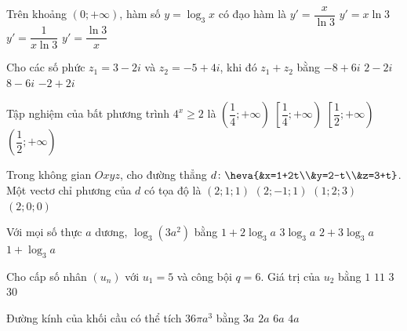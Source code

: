 \begin{ex}%
	Trên khoảng $(0;+\infty)$, hàm số $y=\log_3x$ có đạo hàm là
	\choice
	{$y'=\dfrac{x}{\ln 3}$}
	{$y'=x\ln 3$}
	{\True$y'=\dfrac{1}{x\ln 3}$}
	{$y'=\dfrac{\ln 3}{x}$}
\end{ex}

\begin{ex}%
	Cho các số phức $z_1=3-2i$ và $z_2=-5+4i$, khi đó $z_1+z_2$ bằng
	\choice
	{$-8+6i$}
	{$2-2i$}
	{$8-6i$}
	{\True$-2+2i$}
\end{ex}

\begin{ex}%
	Tập nghiệm của bất phương trình $4^x \ge 2$ là
	\choice
	{$\left(\dfrac{1}{4};+\infty\right)$}
	{$\left[\dfrac{1}{4};+\infty\right)$}
	{\True$\left[\dfrac{1}{2};+\infty\right)$}
	{$\left(\dfrac{1}{2};+\infty\right)$}
	\loigiai{
		$4^x \ge 2 \Leftrightarrow 2^{2x} \ge 2 \Leftrightarrow 2x \ge 1 \Leftrightarrow x \ge \dfrac{1}{2}$.\\
		Vậy tập nghiệm của bất phương trình là $S=\left[\dfrac{1}{2};+\infty\right)$.
	}
\end{ex}

\begin{ex}%
	Trong không gian $Oxyz$, cho đường thẳng $d \colon \heva{&x=1+2t\\&y=2-t\\&z=3+t}$. Một vectơ chỉ phương của $d$ có tọa độ là
	\choice
	{$(2;1;1)$}
	{\True$(2;-1;1)$}
	{$(1;2;3)$}
	{$(2;0;0)$}
\end{ex}

\begin{ex}%
	Với mọi số thực $a$ dương, $\log_3(3a^2)$ bằng
	\choice
	{\True$1+2\log_3a$}
	{$3\log_3a$}
	{$2+3\log_3a$}
	{$1+\log_3a$}
\end{ex}

\begin{ex}%
	Cho cấp số nhân $(u_n)$ với $u_1=5$ và công bội $q=6$. Giá trị của $u_2$ bằng
	\choice
	{$1$}
	{$11$}
	{$3$}
	{\True$30$}
\end{ex}

\begin{ex}%
	Đường kính của khối cầu có thể tích $36\pi a^3$ bằng
	\choice
	{$3a$}
	{$2a$}
	{\True $6a$}
	{$4a$}
\end{ex}

